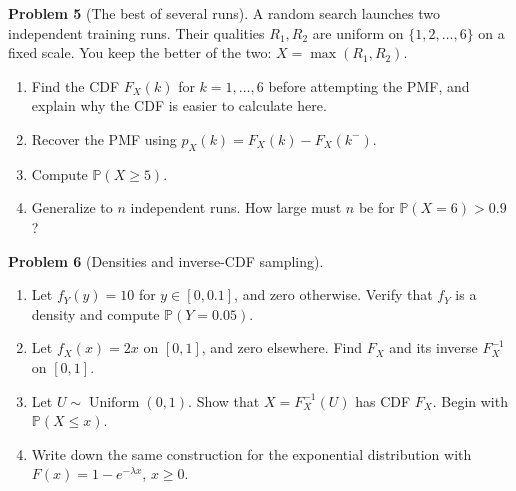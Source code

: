 \documentclass[11pt,a4paper]{article}
\newcommand{\Prob}{\mathbb P}
\newcommand{\problem}[2]{\par\addvspace{6pt}\textbf{Problem #1} (#2). }
\begin{document}
\problem{5}{The best of several runs}
A random search launches two independent training runs. Their qualities
\(R_1,R_2\) are uniform on \(\{1,2,\ldots,6\}\) on a fixed scale.
You keep the better of the two: \(X=\max(R_1,R_2)\).
\begin{enumerate}
\item Find the CDF \(F_X(k)\) for \(k=1,\ldots,6\) before attempting
the PMF, and explain why the CDF is easier to calculate here.
\item Recover the PMF using \(p_X(k)=F_X(k)-F_X(k^-)\).
\item Compute \(\Prob(X\ge5)\).
\item Generalize to \(n\) independent runs. How large must \(n\) be for
\(\Prob(X=6)>0.9\)?
\end{enumerate}

\problem{6}{Densities and inverse-CDF sampling}
\begin{enumerate}
\item Let \(f_Y(y)=10\) for \(y\in[0,0.1]\), and zero otherwise.
Verify that \(f_Y\) is a density and compute \(\Prob(Y=0.05)\).
\item Let \(f_X(x)=2x\) on \([0,1]\), and zero elsewhere. Find \(F_X\)
and its inverse \(F_X^{-1}\) on \([0,1]\).
\item Let \(U\sim\operatorname{Uniform}(0,1)\). Show that
\(X=F_X^{-1}(U)\) has CDF \(F_X\). Begin with \(\Prob(X\le x)\).
\item Write down the same construction for the exponential distribution
with \(F(x)=1-e^{-\lambda x}\), \(x\ge0\).
\end{enumerate}
\end{document}
